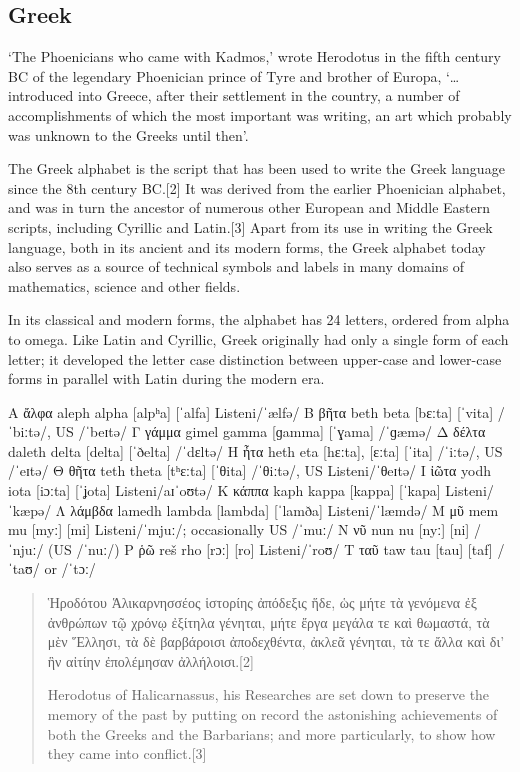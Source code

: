 \subsection{Greek}
\newfontfamily{}
\def\greektext#1{\greek{#1}}

`The Phoenicians who came with Kadmos,' wrote Herodotus in the fifth century BC of the legendary Phoenician prince of Tyre and brother of Europa, `\ldots introduced into Greece, after their settlement in the country, a number of accomplishments of which the most important was writing, an art which probably was unknown to the Greeks until then'. 

The Greek alphabet is the script that has been used to write the Greek language since the 8th century BC.[2] It was derived from the earlier Phoenician alphabet, and was in turn the ancestor of numerous other European and Middle Eastern scripts, including Cyrillic and Latin.[3] Apart from its use in writing the Greek language, both in its ancient and its modern forms, the Greek alphabet today also serves as a source of technical symbols and labels in many domains of mathematics, science and other fields.

In its classical and modern forms, the alphabet has 24 letters, ordered from alpha to omega. Like Latin and Cyrillic, Greek originally had only a single form of each letter; it developed the letter case distinction between upper-case and lower-case forms in parallel with Latin during the modern era.

\bgroup
\greek\obeyspaces

Α	ἄλφα	aleph	alpha	[alpʰa]	[ˈalfa]	Listeni/ˈælfə/
Β	βῆτα	beth	beta	[bɛːta]	[ˈvita]	/ˈbiːtə/, US /ˈbeɪtə/
Γ	γάμμα	gimel	gamma	[ɡamma]	[ˈɣama]	/ˈɡæmə/
Δ	δέλτα	daleth	delta	[delta]	[ˈðelta]	/ˈdɛltə/
Η	ἦτα	  heth	   eta	 [hɛːta], [ɛːta]	[ˈita]	/ˈiːtə/, US /ˈeɪtə/
Θ	θῆτα	teth	theta	[tʰɛːta]	[ˈθita]	/ˈθiːtə/, US Listeni/ˈθeɪtə/
Ι	ἰῶτα	yodh	iota	[iɔːta]	[ˈʝota]	Listeni/aɪˈoʊtə/
Κ	κάππα	kaph	kappa	[kappa]	[ˈkapa]	Listeni/ˈkæpə/
Λ	λάμβδα	lamedh	lambda	[lambda]	[ˈlamða]	Listeni/ˈlæmdə/
Μ	μῦ	mem	mu	[myː]	[mi]	Listeni/ˈmjuː/; occasionally US /ˈmuː/
Ν	νῦ	nun	nu	[nyː]	[ni]	/ˈnjuː/ (US /ˈnuː/)
Ρ	ῥῶ	reš	rho	[rɔː]	[ro]	Listeni/ˈroʊ/
Τ	ταῦ	taw	tau	[tau]	[taf]	/ˈtaʊ/ or /ˈtɔː/

\topline
\begin{quote}
Ἡροδότου Ἁλικαρνησσέος ἱστορίης ἀπόδεξις ἥδε, ὡς μήτε τὰ γενόμενα ἐξ ἀνθρώπων τῷ χρόνῳ ἐξίτηλα γένηται, μήτε ἔργα μεγάλα τε καὶ θωμαστά, τὰ μὲν Ἕλλησι, τὰ δὲ βαρβάροισι ἀποδεχθέντα, ἀκλεᾶ γένηται, τὰ τε ἄλλα καὶ δι' ἣν αἰτίην ἐπολέμησαν ἀλλήλοισι.[2]

Herodotus of Halicarnassus, his Researches are set down to preserve the memory of the past by putting on record the astonishing achievements of both the Greeks and the Barbarians; and more particularly, to show how they came into conflict.[3]
\end{quote}
\bottomline

\egroup